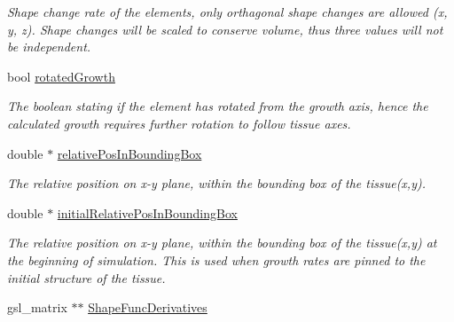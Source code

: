 \begin{DoxyCompactItemize}
\begin{DoxyCompactList}\small\item\em Shape change rate of the elements, only orthagonal shape changes are allowed (x, y, z). Shape changes will be scaled to conserve volume, thus three values will not be independent. \end{DoxyCompactList}\item 
\hypertarget{classShapeBase_aee6a2cd267d49404f5442a48c867860f}{}bool \hyperlink{classShapeBase_aee6a2cd267d49404f5442a48c867860f}{rotated\+Growth}\label{classShapeBase_aee6a2cd267d49404f5442a48c867860f}

\begin{DoxyCompactList}\small\item\em The boolean stating if the element has rotated from the growth axis, hence the calculated growth requires further rotation to follow tissue axes. \end{DoxyCompactList}\item 
\hypertarget{classShapeBase_a7a7826fb2ce3b2e666b65d99b00eadea}{}double $\ast$ \hyperlink{classShapeBase_a7a7826fb2ce3b2e666b65d99b00eadea}{relative\+Pos\+In\+Bounding\+Box}\label{classShapeBase_a7a7826fb2ce3b2e666b65d99b00eadea}

\begin{DoxyCompactList}\small\item\em The relative position on x-\/y plane, within the bounding box of the tissue(x,y). \end{DoxyCompactList}\item 
\hypertarget{classShapeBase_a8825955bac10c5deabb9c02cd27577e9}{}double $\ast$ \hyperlink{classShapeBase_a8825955bac10c5deabb9c02cd27577e9}{initial\+Relative\+Pos\+In\+Bounding\+Box}\label{classShapeBase_a8825955bac10c5deabb9c02cd27577e9}

\begin{DoxyCompactList}\small\item\em The relative position on x-\/y plane, within the bounding box of the tissue(x,y) at the beginning of simulation. This is used when growth rates are pinned to the initial structure of the tissue. \end{DoxyCompactList}\item 
\hypertarget{classShapeBase_a80a8943320a0cdc871565acded52b239}{}gsl\+\_\+matrix $\ast$$\ast$ \hyperlink{classShapeBase_a80a8943320a0cdc871565acded52b239}{Shape\+Func\+Derivatives}\label{classShapeBase_a80a8943320a0cdc871565acded52b239}


\end{DoxyCompactItemize}

